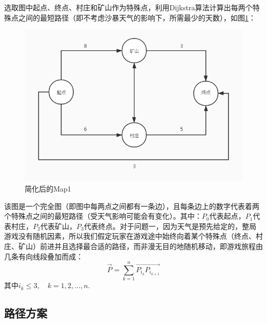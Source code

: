 \documentclass[withoutpre]{cumcmthesis} %
\begin{document}
选取图中起点、终点、村庄和矿山作为特殊点，利用Dijkstra算法计算出每两个特殊点之间的最短路径（即不考虑沙暴天气的影响下，所需最少的天数），如图\ref{fig:map1}：
\begin{figure}[H]
	\centering
	\includegraphics[scale=0.5]{figures/map1new.jpg}
	\caption{简化后的Map1}
	\label{fig:map1}
\end{figure}
该图是一个完全图（即图中每两点之间都有一条边），且每条边上的数字代表着两个特殊点之间的最短路径（受天气影响可能会有变化）。其中：$P_0$代表起点，$P_1$代表村庄，$P_2$代表矿山，$P_3$代表终点。对于问题一，因为天气是预先给定的，整局游戏没有随机因素，所以我们假定玩家在游戏途中始终向着某个特殊点（终点、村庄、矿山）前进并且选择最合适的路径，而非漫无目的地随机移动，即游戏旅程由几条有向线段叠加而成：
\begin{equation}
	\overrightarrow{P}=\sum_{k=1}^{n}\overrightarrow{P_{i_k}P_{i_{k+1}}}
\end{equation}
其中$i_k\leqslant3,\quad k=1,2,\dots,n$.

\subsection{路径方案}
\begin{thebibliography}{9}%

    

\end{thebibliography}
\end{document}
